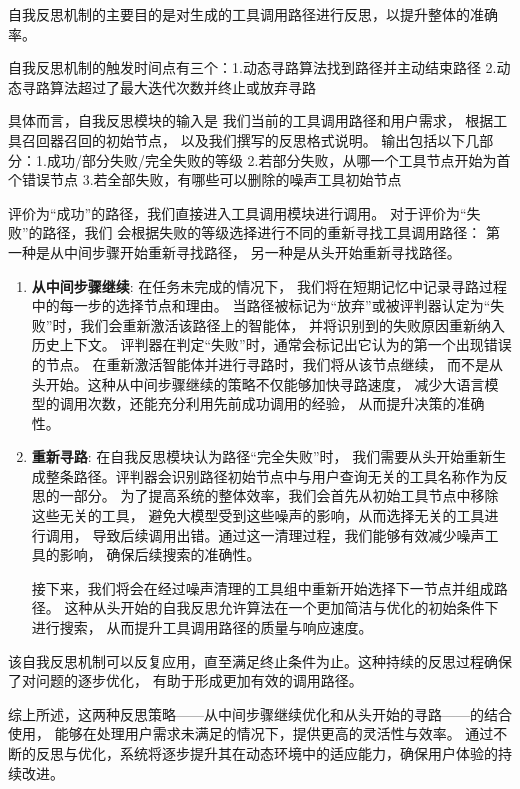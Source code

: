 自我反思机制的主要目的是对生成的工具调用路径进行反思，以提升整体的准确率。

自我反思机制的触发时间点有三个：1.动态寻路算法找到路径并主动结束路径
2.动态寻路算法超过了最大迭代次数并终止或放弃寻路

具体而言，自我反思模块的输入是
我们当前的工具调用路径和用户需求，
根据工具召回器召回的初始节点，
以及我们撰写的反思格式说明。
输出包括以下几部分：1.成功/部分失败/完全失败的等级
2.若部分失败，从哪一个工具节点开始为首个错误节点 3.若全部失败，有哪些可以删除的噪声工具初始节点

评价为“成功”的路径，我们直接进入工具调用模块进行调用。
对于评价为“失败”的路径，我们
会根据失败的等级选择进行不同的重新寻找工具调用路径：
第一种是从中间步骤开始重新寻找路径，
另一种是从头开始重新寻找路径。

\begin{enumerate}
  \item \textbf{从中间步骤继续}: 在任务未完成的情况下，
  我们将在短期记忆中记录寻路过程中的每一步的选择节点和理由。
  当路径被标记为“放弃”或被评判器认定为“失败”时，我们会重新激活该路径上的智能体，
  并将识别到的失败原因重新纳入历史上下文。
  评判器在判定“失败”时，通常会标记出它认为的第一个出现错误的节点。
  在重新激活智能体并进行寻路时，我们将从该节点继续，
  而不是从头开始。这种从中间步骤继续的策略不仅能够加快寻路速度，
  减少大语言模型的调用次数，还能充分利用先前成功调用的经验，
  从而提升决策的准确性。
  \item \textbf{重新寻路}: 在自我反思模块认为路径“完全失败”时，
  我们需要从头开始重新生成整条路径。评判器会识别路径初始节点中与用户查询无关的工具名称作为反思的一部分。
  为了提高系统的整体效率，我们会首先从初始工具节点中移除这些无关的工具，
  避免大模型受到这些噪声的影响，从而选择无关的工具进行调用，
  导致后续调用出错。通过这一清理过程，我们能够有效减少噪声工具的影响，
  确保后续搜索的准确性。\par
  接下来，我们将会在经过噪声清理的工具组中重新开始选择下一节点并组成路径。
  这种从头开始的自我反思允许算法在一个更加简洁与优化的初始条件下进行搜索，
  从而提升工具调用路径的质量与响应速度。
\end{enumerate}
 
该自我反思机制可以反复应用，直至满足终止条件为止。这种持续的反思过程确保了对问题的逐步优化，
有助于形成更加有效的调用路径。

综上所述，这两种反思策略——从中间步骤继续优化和从头开始的寻路——的结合使用，
能够在处理用户需求未满足的情况下，提供更高的灵活性与效率。
通过不断的反思与优化，系统将逐步提升其在动态环境中的适应能力，确保用户体验的持续改进。

